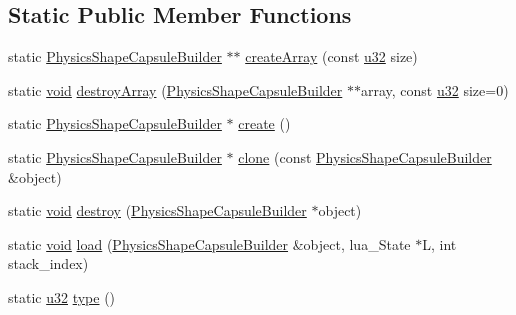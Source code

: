 \subsection*{Static Public Member Functions}
\begin{DoxyCompactItemize}
\item 
static \mbox{\hyperlink{classnjli_1_1_physics_shape_capsule_builder}{Physics\+Shape\+Capsule\+Builder}} $\ast$$\ast$ \mbox{\hyperlink{classnjli_1_1_physics_shape_capsule_builder_a470b4bb9f3fa3294ad0d6f18aed1ab4c}{create\+Array}} (const \mbox{\hyperlink{_util_8h_a10e94b422ef0c20dcdec20d31a1f5049}{u32}} size)
\item 
static \mbox{\hyperlink{_thread_8h_af1e856da2e658414cb2456cb6f7ebc66}{void}} \mbox{\hyperlink{classnjli_1_1_physics_shape_capsule_builder_ae03a51c4a693891bdfb5fae80b7c9c9e}{destroy\+Array}} (\mbox{\hyperlink{classnjli_1_1_physics_shape_capsule_builder}{Physics\+Shape\+Capsule\+Builder}} $\ast$$\ast$array, const \mbox{\hyperlink{_util_8h_a10e94b422ef0c20dcdec20d31a1f5049}{u32}} size=0)
\item 
static \mbox{\hyperlink{classnjli_1_1_physics_shape_capsule_builder}{Physics\+Shape\+Capsule\+Builder}} $\ast$ \mbox{\hyperlink{classnjli_1_1_physics_shape_capsule_builder_a8e2a13fc6a5c9c67231f9987523590f6}{create}} ()
\item 
static \mbox{\hyperlink{classnjli_1_1_physics_shape_capsule_builder}{Physics\+Shape\+Capsule\+Builder}} $\ast$ \mbox{\hyperlink{classnjli_1_1_physics_shape_capsule_builder_ae9612d564c92dd65492bf4a1115243a8}{clone}} (const \mbox{\hyperlink{classnjli_1_1_physics_shape_capsule_builder}{Physics\+Shape\+Capsule\+Builder}} \&object)
\item 
static \mbox{\hyperlink{_thread_8h_af1e856da2e658414cb2456cb6f7ebc66}{void}} \mbox{\hyperlink{classnjli_1_1_physics_shape_capsule_builder_af369946b7504220b7cdb5bd59cc0ac31}{destroy}} (\mbox{\hyperlink{classnjli_1_1_physics_shape_capsule_builder}{Physics\+Shape\+Capsule\+Builder}} $\ast$object)
\item 
static \mbox{\hyperlink{_thread_8h_af1e856da2e658414cb2456cb6f7ebc66}{void}} \mbox{\hyperlink{classnjli_1_1_physics_shape_capsule_builder_a4f37e94a0abb1af66d3299281520476a}{load}} (\mbox{\hyperlink{classnjli_1_1_physics_shape_capsule_builder}{Physics\+Shape\+Capsule\+Builder}} \&object, lua\+\_\+\+State $\ast$L, int stack\+\_\+index)
\item 
static \mbox{\hyperlink{_util_8h_a10e94b422ef0c20dcdec20d31a1f5049}{u32}} \mbox{\hyperlink{classnjli_1_1_physics_shape_capsule_builder_ae351e11296275cf1cea9aed9c06d3346}{type}} ()
\end{DoxyCompactItemize}
